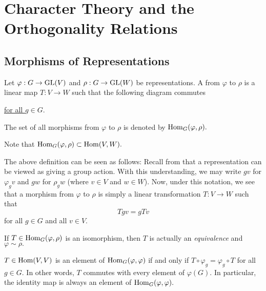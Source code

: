 \section{Character Theory and the Orthogonality Relations} \label{sec:02}
\subsection{Morphisms of Representations}

\begin{defn}%
	Let $\varphi:G \to \operatorname{GL}(V)$ and $\rho:G \to \operatorname{GL}(W)$ be representations. A  from $\varphi$ to $\rho$ is a linear map $T : V \to W$ such that the following diagram commutes
	\begin{center}
	\end{center}
	\underline{for all $g \in G.$}

	The set of all morphisms from $\varphi$ to $\rho$ is denoted by $\operatorname{Hom}_{G}(\varphi, \rho).$ 
\end{defn}
Note that $\operatorname{Hom}_{G}(\varphi, \rho) \subset \operatorname{Hom}(V, W).$ %

The above definition can be seen as follows: Recall from  that a representation can be viewed as giving a group action. With this understanding, we may write $gv$ for $\varphi_gv$ and $gw$ for $\rho_gw$ (where $v \in V$ and $w \in W$). Now, under this notation, we see that a morphism from $\varphi$ to $\rho$ is simply a linear transformation $T : V \to W$ such that
\begin{equation*} 
	Tgv = gTv
\end{equation*}
for all $g \in G$ and all $v \in V.$

\begin{rem}
	If $T \in \operatorname{Hom}_{G}(\varphi, \rho)$ is an isomorphism, then $T$ is actually an \emph{equivalence} and $\varphi\sim\rho.$
\end{rem}

\begin{rem} \label{rem:commutingmorphisms}
	$T \in \operatorname{Hom}(V, V)$ is an element of $\operatorname{Hom}_{G}(\varphi, \varphi)$ if and only if $T \circ \varphi_g = \varphi_g \circ T$ for all $g \in G.$ In other words, $T$ commutes with every element of $\varphi(G).$ In particular, the identity map is always an element of $\operatorname{Hom}_{G}(\varphi, \varphi).$
\end{rem}

